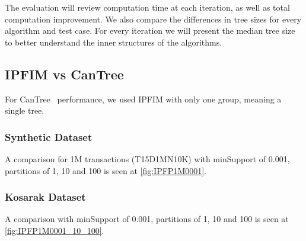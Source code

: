The evaluation will review computation time at each iteration, as well as total computation improvement.  We also compare the differences in tree sizes for every algorithm and test case. For every iteration we will present the median tree size to better understand the inner structures of the algorithms. 

\subsection{IPFIM vs CanTree}
For CanTree~\cite{leung2005cantree} performance, we used IPFIM with only one group, meaning a single tree.

\subsubsection{Synthetic Dataset}
A comparison for 1M transactions (T15D1MN10K) with minSupport of 0.001, partitions of 1, 10 and 100 is seen at \autoref{fig:IPFP1M0001}.

\subsubsection{Kosarak Dataset}
A comparison with minSupport of 0.001, partitions of 1, 10 and 100 is seen at \autoref{fig:IPFP1M0001_10_100}.
